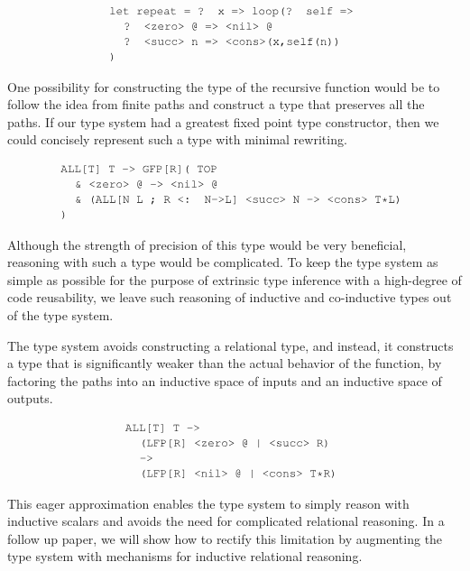 \documentclass[acmsmall]{acmart}
\theoremstyle{definition}
\begin{document}
\[
  \begin{array}[t]{@{} l}
      \J{let repeat = ? x => loop(? self =>}
      \\
      \I \J{? <zero> @ => <nil> @}
      \\
      \I \J{? <succ> n => <cons>(x,self(n))}
      \\
      \J{)}
  \end{array}
\]

One possibility for constructing the type of the recursive function would
be to follow the idea from finite paths and construct a type 
that preserves all the paths. If our type system had a greatest fixed point
type constructor, then we could concisely represent such a type with minimal
rewriting.

\[
  \begin{array}[t]{@{} l}
      \J{ALL[T] T -> GFP[R]( TOP} 
      \\
      \I \J{\& <zero> @ -> <nil> @}
      \\
      \I \J{\& (ALL[N L ; R <: N->L] <succ> N -> <cons> T*L)}
      \\
      \J{)} 
  \end{array}
\]

Although the strength of precision of this type would be very beneficial,
reasoning with such a type would be complicated. To keep the type system as
simple as possible for the purpose of extrinsic type inference with a high-degree
of code reusability, we leave such reasoning of inductive and co-inductive types out of
the type system. 

The type system avoids constructing a relational type, and instead, it
constructs a type that is significantly weaker than the actual behavior of the function,
by factoring the paths into an inductive space of inputs and an inductive space of outputs. 

\[
  \begin{array}[t]{@{} l}
      \J{ALL[T] T ->} 
      \\
      \I \J{(LFP[R] <zero> @ | <succ> R)}
      \\
      \I \J{->}
      \\
      \I \J{(LFP[R] <nil> @ | <cons> T*R)}
  \end{array}
\]

This eager approximation enables the type system
to simply reason with inductive scalars and avoids the need for complicated
relational reasoning. In a follow up paper,
we will show how to rectify this limitation by augmenting the type system with
mechanisms for inductive relational reasoning.
\end{document}
